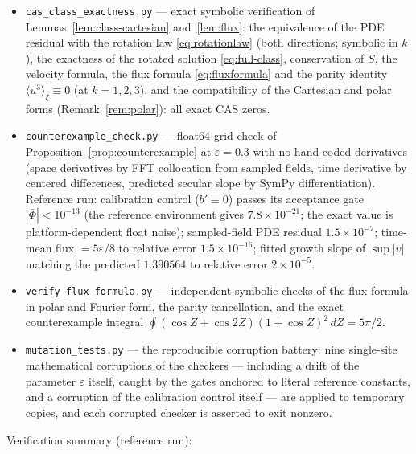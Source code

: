 \documentclass[11pt]{amsart}
\theoremstyle{definition}
\theoremstyle{remark}
\newcommand{\Fbar}{\bar\Phi}
\newcommand{\mean}[1]{\langle #1\rangle}
\begin{document}
\begin{itemize}
\item \texttt{cas\_class\_exactness.py} --- exact symbolic verification
of Lemmas~\ref{lem:class-cartesian} and~\ref{lem:flux}: the equivalence
of the PDE residual with the rotation law \eqref{eq:rotationlaw} (both
directions; symbolic in $k$), the exactness of the rotated solution
\eqref{eq:full-class}, conservation of $S$, the velocity formula, the
flux formula \eqref{eq:fluxformula} and the parity identity
$\mean{u^3}_\xi\equiv0$ (at $k=1,2,3$), and the compatibility of the
Cartesian and polar forms (Remark~\ref{rem:polar}): all exact CAS
zeros.
\item \texttt{counterexample\_check.py} --- float64 grid check of
Proposition~\ref{prop:counterexample} at $\varepsilon=0.3$ with no
hand-coded derivatives (space derivatives by FFT collocation from
sampled fields, time derivative by centered differences, predicted
secular slope by SymPy differentiation). Reference run: calibration
control ($b'\equiv0$) passes its acceptance gate $|\Fbar|<10^{-13}$
(the reference environment gives $7.8\times10^{-21}$; the exact value
is platform-dependent float noise); sampled-field PDE residual
$1.5\times10^{-7}$; time-mean flux $=5\varepsilon/8$ to relative error
$1.5\times10^{-16}$; fitted growth slope of $\sup|v|$ matching the
predicted $1.390564$ to relative error $2\times10^{-5}$.
\item \texttt{verify\_flux\_formula.py} --- independent symbolic checks
of the flux formula in polar and Fourier form, the parity
cancellation, and the exact counterexample integral
$\oint(\cos Z+\cos2Z)(1+\cos Z)^2\,dZ=5\pi/2$.
\item \texttt{mutation\_tests.py} --- the reproducible corruption
battery: nine single-site mathematical corruptions of the checkers ---
including a drift of the parameter $\varepsilon$ itself, caught by the
gates anchored to literal reference constants, and a corruption of the
calibration control itself --- are applied to temporary copies, and
each corrupted checker is asserted to exit nonzero.
\end{itemize}

Verification summary (reference run):
\end{document}
